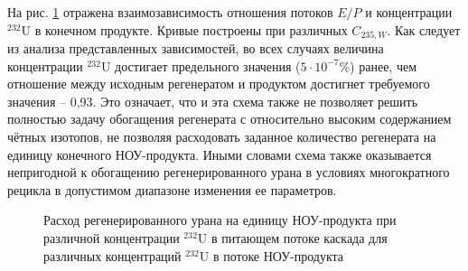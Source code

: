На рис. \ref{sc3_1.second} отражена взаимозависимость отношения потоков $E/P$ и концентрации $^{232}$U в конечном продукте. Кривые построены при различных $C_{235, W}$. Как следует из анализа представленных зависимостей, во всех случаях величина концентрации  $^{232}$U достигает предельного значения ($5\cdot10^{-7}$\%) ранее, чем отношение между исходным регенератом и продуктом достигнет требуемого значения -- 0,93. Это означает, что и эта схема также не позволяет решить полностью задачу обогащения регенерата с относительно высоким содержанием чётных изотопов, не позволяя расходовать заданное количество регенерата на единицу конечного НОУ-продукта. Иными словами схема также оказывается непригодной к обогащению регенерированного урана в условиях многократного рецикла в допустимом диапазоне изменения ее параметров.

\begin{figure}[ht]
  \caption{Расход регенерированного урана на единицу НОУ-продукта  при различной концентрации $^{232}$U в питающем потоке каскада для различных концентраций $^{232}$U в потоке НОУ-продукта}\label{sc3_1.second}
\end{figure}



